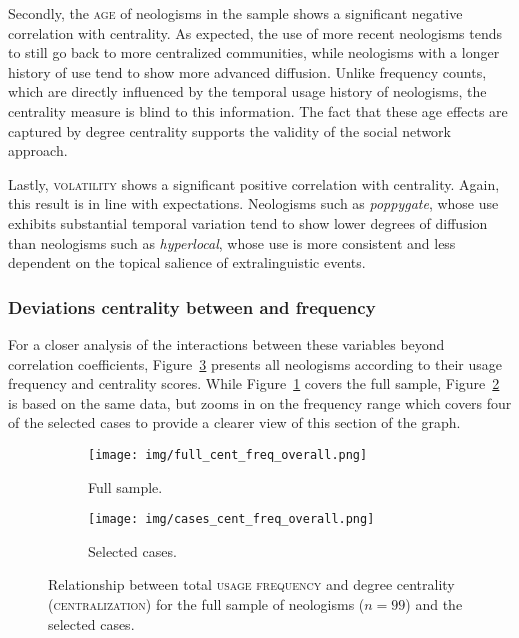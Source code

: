 \documentclass[
  a4paper,
  abstract=on,
  captions=tableabove,
  ]{scrartcl}
\newcommand{\ol}[1]{\emph{#1}}
\begin{document}
      Secondly, the \textsc{age} of neologisms in the sample shows a significant negative correlation with centrality. As expected, the use of more recent neologisms tends to still go back to more centralized communities, while neologisms with a longer history of use tend to show more advanced diffusion. Unlike frequency counts, which are directly influenced by the temporal usage history of neologisms, the centrality measure is blind to this information. The fact that these age effects are captured by degree centrality supports the validity of the social network approach.

      Lastly, \textsc{volatility} shows a significant positive correlation with centrality. Again, this result is in line with expectations. Neologisms such as \ol{poppygate}, whose use exhibits substantial temporal variation tend to show lower degrees of diffusion than neologisms such as \ol{hyperlocal}, whose use is more consistent and less dependent on the topical salience of extralinguistic events.

    \subsubsection{Deviations centrality between and frequency}
      \label{subsec:cent-vs-freq_deviations}

      For a closer analysis of the interactions between these variables beyond correlation coefficients, Figure~\ref{fig:cent-vs-freq} presents all neologisms according to their usage frequency and centrality scores. While Figure~\ref{subfig:cent-vs-freq_sample} covers the full sample, Figure~\ref{subfig:cent-vs-freq_cases} is based on the same data, but zooms in on the frequency range which covers four of the selected cases to provide a clearer view of this section of the graph.

      \begin{figure}
        \centering
        \begin{subfigure}{.49\linewidth}
          \caption{Full sample.}
          \label{subfig:cent-vs-freq_sample}
          \centering
          \texttt{[image: img/full\_cent\_freq\_overall.png]}
        \end{subfigure}
        \begin{subfigure}{.49\linewidth}
          \caption{Selected cases.}
          \label{subfig:cent-vs-freq_cases}
          \centering
          \texttt{[image: img/cases\_cent\_freq\_overall.png]}
        \end{subfigure}
        \caption[Scatterplot of \textsc{usage frequency} and \textsc{centrality}]{Relationship between total \textsc{usage frequency} and degree centrality (\textsc{centralization}) for the full sample of neologisms ($n=99$) and the selected cases.}
        \label{fig:cent-vs-freq}
      \end{figure}
\end{document}
